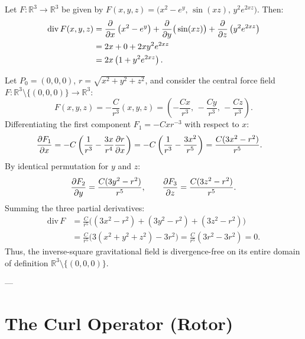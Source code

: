 \begin{exemple}
Let $F : \mathbb{R}^3 \to \mathbb{R}^3$ be given by $F(x, y, z) = \big(x^2 - e^y, \, \sin(xz), \, y^2 e^{2xz}\big)$. Then:
\begin{align}
    \mathrm{div}\,F(x, y, z) &= \pdv{}{x}\left(x^2 - e^y\right) + \pdv{}{y}\big(\sin(xz)\big) + \pdv{}{z}\left(y^2 e^{2xz}\right) \nonumber \\
    &= 2x + 0 + 2x y^2 e^{2xz} \nonumber \\
    &= 2x\left(1 + y^2 e^{2xz}\right).
\end{align}
\end{exemple}

\begin{exemple}
Let $P_0 = (0, 0, 0)$, $r = \sqrt{x^2 + y^2 + z^2}$, and consider the central force field $F : \mathbb{R}^3 \setminus \{(0,0,0)\} \to \mathbb{R}^3$:
\begin{equation}
    F(x, y, z) = -\frac{C}{r^3} (x, y, z) = \left( -\frac{Cx}{r^3}, \, -\frac{Cy}{r^3}, \, -\frac{Cz}{r^3} \right).
\end{equation}
Differentiating the first component $F_1 = -C x r^{-3}$ with respect to $x$:
\begin{align}
    \pdv{F_1}{x} &= -C \left( \frac{1}{r^3} - \frac{3x}{r^4} \pdv{r}{x} \right) = -C \left( \frac{1}{r^3} - \frac{3x^2}{r^5} \right) = \frac{C(3x^2 - r^2)}{r^5}.
\end{align}
By identical permutation for $y$ and $z$:
\begin{equation}
    \pdv{F_2}{y} = \frac{C(3y^2 - r^2)}{r^5}, \qquad \pdv{F_3}{z} = \frac{C(3z^2 - r^2)}{r^5}.
\end{equation}
Summing the three partial derivatives:
\begin{align}
    \mathrm{div}\,F &= \frac{C}{r^5} \Big( (3x^2 - r^2) + (3y^2 - r^2) + (3z^2 - r^2) \Big) \nonumber \\
    &= \frac{C}{r^5} \Big( 3(x^2 + y^2 + z^2) - 3r^2 \Big) = \frac{C}{r^5}(3r^2 - 3r^2) = 0.
\end{align}
Thus, the inverse-square gravitational field is divergence-free on its entire domain of definition $\mathbb{R}^3 \setminus \{(0,0,0)\}$.
\end{exemple}

---

\section{The Curl Operator (Rotor)}

